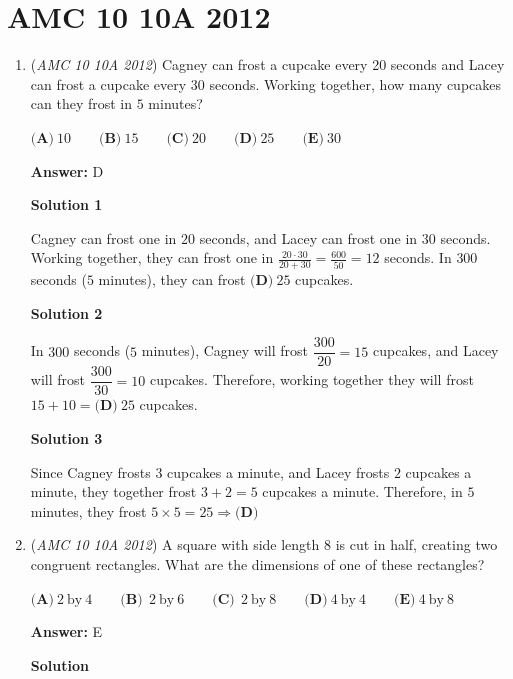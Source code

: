 \section{AMC 10 10A 2012}
        \begin{enumerate}
        	\item (\textit{AMC 10 10A 2012}) Cagney can frost a cupcake every 20 seconds and Lacey can frost a cupcake every $30$ seconds. Working together, how many cupcakes can they frost in $5$ minutes?


 $\textbf{(A)}\ 10\qquad\textbf{(B)}\ 15\qquad\textbf{(C)}\ 20\qquad\textbf{(D)}\ 25\qquad\textbf{(E)}\ 30$

 \textbf{Answer: }D



\textbf{Solution 1}

Cagney can frost one in $20$ seconds, and Lacey can frost one in $30$ seconds. Working together, they can frost one in $\frac{20\cdot30}{20+30} = \frac{600}{50} = 12$ seconds. In $300$ seconds ($5$ minutes), they can frost $\boxed{\textbf{(D)}\ 25}$ cupcakes.

 



\textbf{Solution 2}

In $300$ seconds ($5$ minutes), Cagney will frost $\dfrac{300}{20} = 15$ cupcakes, and Lacey will frost $\dfrac{300}{30} = 10$ cupcakes. Therefore, working together they will frost $15 + 10 = \boxed{\textbf{(D)}\ 25}$ cupcakes.

 



\textbf{Solution 3}

Since Cagney frosts $3$ cupcakes a minute, and Lacey frosts $2$ cupcakes a minute, they together frost $3+2=5$ cupcakes a minute. Therefore, in $5$ minutes, they frost $5\times5 = 25 \Rightarrow \boxed{\textbf{(D)}}$



	\item (\textit{AMC 10 10A 2012}) A square with side length $8$ is cut in half, creating two congruent rectangles. What are the dimensions of one of these rectangles?


 $\textbf{(A)}\ 2\ \text{by}\ 4\qquad\textbf{(B)}\ \ 2\ \text{by}\ 6\qquad\textbf{(C)}\ \ 2\ \text{by}\ 8\qquad\textbf{(D)}\ 4\ \text{by}\ 4\qquad\textbf{(E)}\ 4\ \text{by}\ 8$

 \textbf{Answer: }E



\textbf{Solution}


\end{enumerate}
